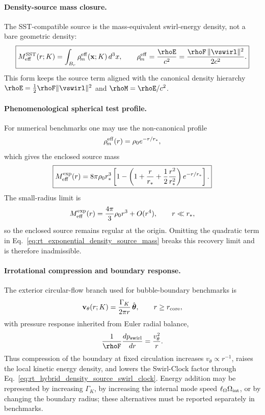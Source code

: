 \paragraph{Density-source mass closure.}
The SST-compatible source is the mass-equivalent swirl-energy density, not a bare
geometric density:
\begin{equation}
\boxed{
M_{\rm eff}^{\rm SST}(r;K)
=
\int_{B_r}\rho_{\!m}^{\rm eff}(\mathbf{x};K)\,d^3x,
\qquad
\rho_{\!m}^{\rm eff}
=
\frac{\rhoE}{c^2}
=
\frac{\rhoF\,\|\vswirl\|^2}{2c^2}.
}
\label{eq:rt_density_source_mass_closure}
\end{equation}
This form keeps the source term aligned with the canonical density hierarchy
$\rhoE=\tfrac12\rhoF\|\vswirl\|^2$ and $\rhoM=\rhoE/c^2$.

\paragraph{Phenomenological spherical test profile.}
For numerical benchmarks one may use the non-canonical profile
\begin{equation}
\rho_{\!m}^{\rm eff}(r)=\rho_0 e^{-r/r_*},
\end{equation}
which gives the enclosed source mass
\begin{equation}
\boxed{
M_{\rm eff}^{\rm exp}(r)
=
8\pi\rho_0 r_*^3
\left[
1-
\left(
1+\frac{r}{r_*}
+\frac{1}{2}\frac{r^2}{r_*^2}
\right)e^{-r/r_*}
\right].
}
\label{eq:rt_exponential_density_source_mass}
\end{equation}
The small-radius limit is
\begin{equation}
M_{\rm eff}^{\rm exp}(r)
=
\frac{4\pi}{3}\rho_0 r^3+O(r^4),
\qquad r\ll r_*,
\end{equation}
so the enclosed source remains regular at the origin.  Omitting the quadratic
term in Eq.~\eqref{eq:rt_exponential_density_source_mass} breaks this recovery
limit and is therefore inadmissible.

\paragraph{Irrotational compression and boundary response.}
The exterior circular-flow branch used for bubble-boundary benchmarks is
\begin{equation}
\mathbf{v}_{\theta}(r;K)
=\frac{\Gamma_K}{2\pi r}\,\hat{\boldsymbol{\theta}},
\qquad r\ge r_{\rm core},
\label{eq:rt_irrotational_boundary_velocity}
\end{equation}
with pressure response inherited from Euler radial balance,
\begin{equation}
\frac{1}{\rhoF}\frac{dp_{\rm swirl}}{dr}
=\frac{v_{\theta}^{2}}{r}.
\label{eq:rt_boundary_pressure_balance}
\end{equation}
Thus compression of the boundary at fixed circulation increases
$v_{\theta}\propto r^{-1}$, raises the local kinetic energy density, and lowers
the Swirl-Clock factor through Eq.~\eqref{eq:rt_hybrid_density_source_swirl_clock}.
Energy addition may be represented by increasing $\Gamma_K$, by increasing the
internal mode speed $\ell_{\Omega}\Omega_{\rm int}$, or by changing the boundary
radius; these alternatives must be reported separately in benchmarks.

